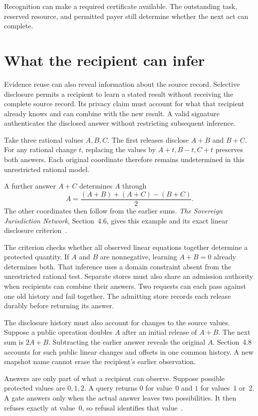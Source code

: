 \documentclass{momentum}
\begin{document}
Recognition can make a required certificate available.
The outstanding task, reserved resource, and permitted payer still determine whether the next act can complete.

\section{What the recipient can infer}
\label{sec:privacy}

Evidence reuse can also reveal information about the source record. Selective disclosure permits a recipient to learn a stated result without receiving the complete source record.
Its privacy claim must account for what that recipient already knows and can combine with the new result.
A valid signature authenticates the disclosed answer without restricting subsequent inference.

Take three rational values $A,B,C$.
The first releases disclose $A+B$ and $B+C$.
For any rational change $t$, replacing the values by $A+t,B-t,C+t$ preserves both answers.
Each original coordinate therefore remains undetermined in this unrestricted rational model.

A further answer $A+C$ determines $A$ through
\[
 A=\frac{(A+B)+(A+C)-(B+C)}{2}.
\]
The other coordinates then follow from the earlier sums.
\emph{The Sovereign Jurisdiction Network}, Section~4.6, gives this example and its exact linear disclosure criterion~\cite{sjn}.

The criterion checks whether all observed linear equations together determine a protected quantity.
If $A$ and $B$ are nonnegative, learning $A+B=0$ already determines both.
That inference uses a domain constraint absent from the unrestricted rational test.
Separate stores must also share an admission authority when recipients can combine their answers.
Two requests can each pass against one old history and fail together.
The admitting store records each release durably before returning its answer.

The disclosure history must also account for changes to the source values.
Suppose a public operation doubles $A$ after an initial release of $A+B$.
The next sum is $2A+B$.
Subtracting the earlier answer reveals the original $A$.
Section~4.8 accounts for such public linear changes and offsets in one common history.
A new snapshot name cannot erase the recipient's earlier observation.

Answers are only part of what a recipient can observe.
Suppose possible protected values are $0,1,2$.
A query returns $0$ for value~0 and $1$ for values~1 or~2.
A gate answers only when the actual answer leaves two possibilities.
It then refuses exactly at value~0, so refusal identifies that value~\cite[Section~4.9]{sjn}.
\end{document}
